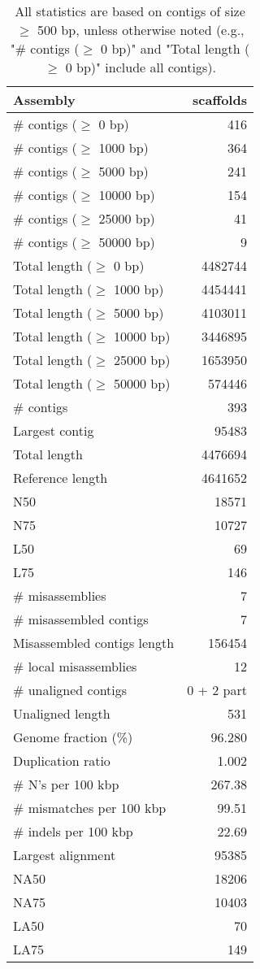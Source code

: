 \documentclass[12pt,a4paper]{article}
\begin{document}
\begin{table}[ht]
\begin{center}
\caption{All statistics are based on contigs of size $\geq$ 500 bp, unless otherwise noted (e.g., "\# contigs ($\geq$ 0 bp)" and "Total length ($\geq$ 0 bp)" include all contigs).}
\begin{tabular}{|l*{1}{|r}|}
\hline
Assembly & scaffolds \\ \hline
\# contigs ($\geq$ 0 bp) & 416 \\ \hline
\# contigs ($\geq$ 1000 bp) & 364 \\ \hline
\# contigs ($\geq$ 5000 bp) & 241 \\ \hline
\# contigs ($\geq$ 10000 bp) & 154 \\ \hline
\# contigs ($\geq$ 25000 bp) & 41 \\ \hline
\# contigs ($\geq$ 50000 bp) & 9 \\ \hline
Total length ($\geq$ 0 bp) & 4482744 \\ \hline
Total length ($\geq$ 1000 bp) & 4454441 \\ \hline
Total length ($\geq$ 5000 bp) & 4103011 \\ \hline
Total length ($\geq$ 10000 bp) & 3446895 \\ \hline
Total length ($\geq$ 25000 bp) & 1653950 \\ \hline
Total length ($\geq$ 50000 bp) & 574446 \\ \hline
\# contigs & 393 \\ \hline
Largest contig & 95483 \\ \hline
Total length & 4476694 \\ \hline
Reference length & 4641652 \\ \hline
N50 & 18571 \\ \hline
N75 & 10727 \\ \hline
L50 & 69 \\ \hline
L75 & 146 \\ \hline
\# misassemblies & 7 \\ \hline
\# misassembled contigs & 7 \\ \hline
Misassembled contigs length & 156454 \\ \hline
\# local misassemblies & 12 \\ \hline
\# unaligned contigs & 0 + 2 part \\ \hline
Unaligned length & 531 \\ \hline
Genome fraction (\%) & 96.280 \\ \hline
Duplication ratio & 1.002 \\ \hline
\# N's per 100 kbp & 267.38 \\ \hline
\# mismatches per 100 kbp & 99.51 \\ \hline
\# indels per 100 kbp & 22.69 \\ \hline
Largest alignment & 95385 \\ \hline
NA50 & 18206 \\ \hline
NA75 & 10403 \\ \hline
LA50 & 70 \\ \hline
LA75 & 149 \\ \hline
\end{tabular}
\end{center}
\end{table}
\end{document}
